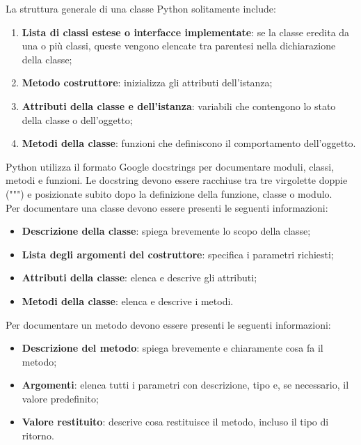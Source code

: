 La struttura generale di una classe Python solitamente include:
\begin{enumerate}
    \item \textbf{Lista di classi estese o interfacce implementate}: se la classe eredita da una o più classi, queste vengono elencate tra parentesi nella dichiarazione della classe;
    \item \textbf{Metodo costruttore}: inizializza gli attributi dell'istanza;
    \item \textbf{Attributi della classe e dell'istanza}: variabili che contengono lo stato della classe o dell'oggetto;
    \item \textbf{Metodi della classe}: funzioni che definiscono il comportamento dell'oggetto.
\end{enumerate}
Python utilizza il formato Google docstrings per documentare moduli, classi, metodi e funzioni. Le docstring devono essere racchiuse tra tre virgolette doppie (""") e posizionate subito dopo la definizione della funzione, classe o modulo.\\
Per documentare una classe devono essere presenti le seguenti informazioni:
\begin{itemize}
    \item \textbf{Descrizione della classe}: spiega brevemente lo scopo della classe;
    \item \textbf{Lista degli argomenti del costruttore}: specifica i parametri richiesti;
    \item \textbf{Attributi della classe}: elenca e descrive gli attributi;
    \item \textbf{Metodi della classe}: elenca e descrive i metodi.
\end{itemize}
Per documentare un metodo devono essere presenti le seguenti informazioni:
\begin{itemize}
    \item \textbf{Descrizione del metodo}: spiega brevemente e chiaramente cosa fa il metodo;
    \item \textbf{Argomenti}: elenca tutti i parametri con descrizione, tipo e, se necessario, il valore predefinito;
    \item \textbf{Valore restituito}: descrive cosa restituisce il metodo, incluso il tipo di ritorno.
\end{itemize}

